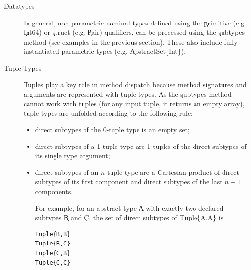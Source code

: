 \begin{description}

  \item[Datatypes]
        In general, non-parametric nominal types defined using the \c{primitive} (e.g. \c{Int64}) or
        \c{struct} (e.g. \c{Pair}) qualifiers,  can be processed
        using the \c{subtypes} method (see examples in the previous section).%
        These also include fully-instantiated parametric types
        (e.g. \c{AbstractSet\{Int\}}).

  \item[Tuple Types]
        Tuples play a key role in method dispatch because method
        signatures and arguments are represented with tuple types. As the \c{subtypes} method
        cannot work with tuples (for any input tuple, it returns an empty
        array), tuple types are unfolded according to the following rule:
        \begin{itemize}
          \item direct subtypes of the 0-tuple type is an empty set;
          \item direct subtypes of a 1-tuple type are 1-tuples of the direct 
          subtypes of its single type argument;
          \item direct subtypes of an $n$-tuple type are a Cartesian product of
          direct subtypes of its first component and direct subtypes of the last
          $n-1$ components.

          For example, for an abstract type \c{A} with exactly two declared
          subtypes \c{B} and \c{C}, the set of direct subtypes of
          \c{Tuple\{A,A\}} is

\begin{minipage}{.9\textwidth}
        \begin{lstlisting}
Tuple{B,B}
Tuple{B,C}
Tuple{C,B}
Tuple{C,C}
        \end{lstlisting}
\end{minipage}

        \end{itemize}


\end{description}
